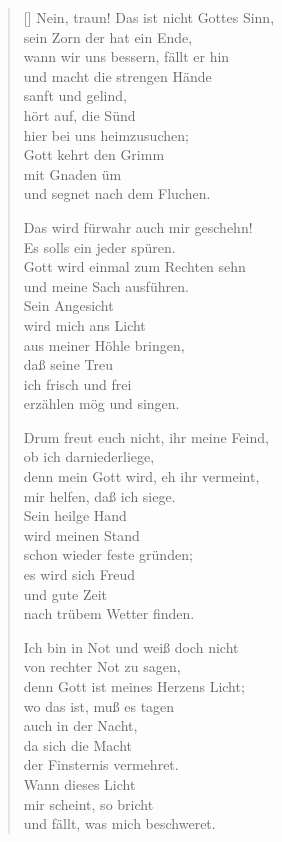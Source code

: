 \begin{multicols}{2}
\begin{verse}[\versewidth]
 Nein, traun! Das ist nicht Gottes Sinn,\\
sein Zorn der hat ein Ende,\\
wann wir uns bessern, fällt er hin\\
und macht die strengen Hände\\
sanft und gelind,\\
hört auf, die Sünd\\
hier bei uns heimzusuchen;\\
Gott kehrt den Grimm\\
mit Gnaden üm\\
und segnet nach dem Fluchen.

 Das wird fürwahr auch mir geschehn!\\
Es solls ein jeder spüren.\\
Gott wird einmal zum Rechten sehn\\
und meine Sach ausführen.\\
Sein Angesicht\\
wird mich ans Licht\\
aus meiner Höhle bringen,\\
daß seine Treu\\
ich frisch und frei\\
erzählen mög und singen.

 Drum freut euch nicht, ihr meine Feind,\\
ob ich darniederliege,\\
denn mein Gott wird, eh ihr vermeint,\\
mir helfen, daß ich siege.\\
Sein heilge Hand\\
wird meinen Stand\\
schon wieder feste gründen;\\
es wird sich Freud\\
und gute Zeit\\
nach trübem Wetter finden.

 Ich bin in Not und weiß doch nicht\\
von rechter Not zu sagen,\\
denn Gott ist meines Herzens Licht;\\
wo das ist, muß es tagen\\
auch in der Nacht,\\
da sich die Macht\\
der Finsternis vermehret.\\
Wann dieses Licht\\
mir scheint, so bricht\\
und fällt, was mich beschweret.

\end{verse}
\end{multicols}



